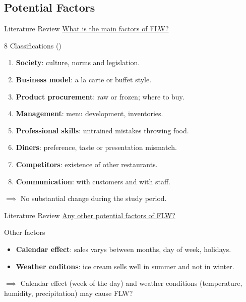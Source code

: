 \documentclass{beamer}
\begin{document}
\subsection{Potential Factors}
\begin{frame}{Literature Review}
    \underline{What is the main factors of FLW?}
    \begin{block}{8 Classifications (\cite{Heikkila2016-el})}
        \begin{enumerate}
            \item \textbf{Society}: \small culture, norms and legislation.
            \item \textbf{Business model}: \small a la carte or buffet style.
            \item \textbf{Product procurement}: \small raw or frozen; where to buy.
            \item \textbf{Management}: \small menu development, inventories.
            \item \textbf{Professional skills}: \small untrained mistakes throwing food.
            \item \textbf{Diners}: \small preference, taste or presentation mismatch.
            \item \textbf{Competitors}: \small existence of other restaurants.
            \item \textbf{Communication}: \small with customers and with staff.
        \end{enumerate}
    \end{block}
    $\implies$ No substantial change during the study period.
\end{frame}

\begin{frame}{Literature Review}
    \underline{Any other potential factors of FLW?}
    \begin{block}{Other factors}
        \begin{itemize}
            \item \textbf{Calendar effect}: sales varys between months, day of week, holidays.
            \item \textbf{Weather coditons}: ice cream sells well in summer and not in winter.
        \end{itemize}       
    \end{block}
    $\implies$ Calendar effect (week of the day) and weather conditions (temperature, humidity, precipitation) may cause FLW?
\end{frame}
\end{document}
